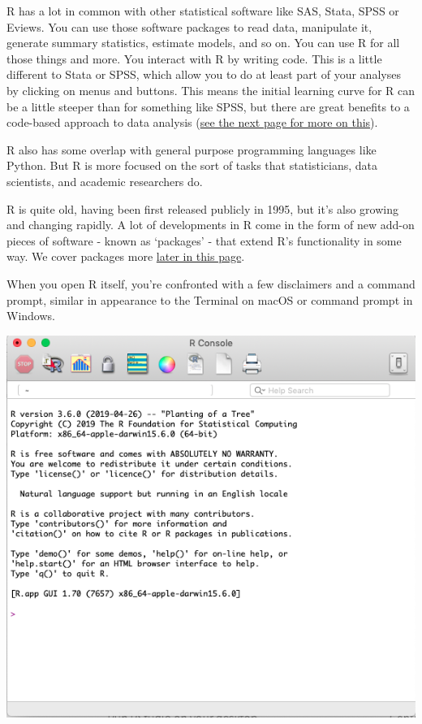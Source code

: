 \documentclass[]{book}
\begin{document}
R has a lot in common with other statistical software like SAS, Stata, SPSS or Eviews. You can use those software packages to read data, manipulate it, generate summary statistics, estimate models, and so on. You can use R for all those things and more. You interact with R by writing code. This is a little different to Stata or SPSS, which allow you to do at least part of your analyses by clicking on menus and buttons. This means the initial learning curve for R can be a little steeper than for something like SPSS, but there are great benefits to a code-based approach to data analysis (\protect\hyperlink{why-script}{see the next page for more on this}).

R also has some overlap with general purpose programming languages like Python. But R is more focused on the sort of tasks that statisticians, data scientists, and academic researchers do.

R is quite old, having been first released publicly in 1995, but it's also growing and changing rapidly. A lot of developments in R come in the form of new add-on pieces of software - known as `packages' - that extend R's functionality in some way. We cover packages more \protect\hyperlink{packages}{later in this page}.

When you open R itself, you're confronted with a few disclaimers and a command prompt, similar in appearance to the Terminal on macOS or command prompt in Windows.

\includegraphics[width=7.99in]{atlas/r_screenshot}
\end{document}
